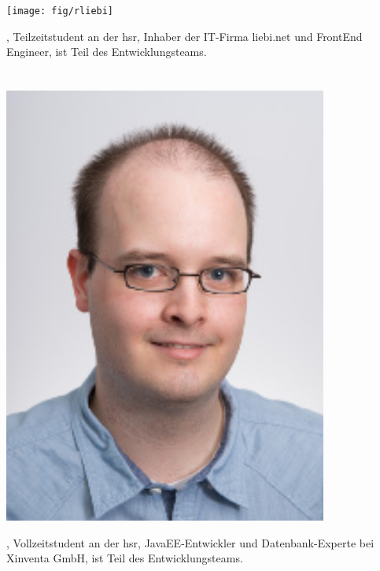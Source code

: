 \section{\rlif}
\begin{minipage}[t]{0.25\textwidth}
	\vspace{0pt}
	\texttt{[image: fig/rliebi]}
\end{minipage}
\begin{minipage}[t]{0.8\textwidth}
	\vspace{0pt} 
	\rlif, Teilzeitstudent an der \gls{hsr}, Inhaber der IT-Firma liebi.net und FrontEnd Engineer, ist Teil des Entwicklungsteams.
\end{minipage}

\section{\chuf}
\begin{minipage}[t]{0.25\textwidth}
	\vspace{0pt}
	\includegraphics[width=0.8\textwidth]{fig/chuesler}
\end{minipage}
\begin{minipage}[t]{0.8\textwidth}
	\vspace{0pt}
	\chuf, Vollzeitstudent an der \gls{hsr}, JavaEE-Entwickler und Datenbank-Experte bei Xinventa GmbH, ist Teil des Entwicklungsteams.
\end{minipage}


